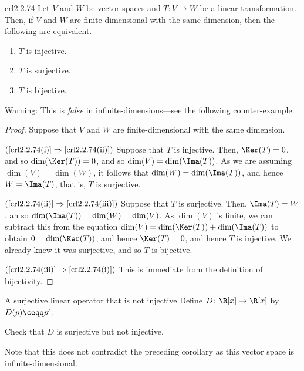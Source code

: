 \begin{crl}{}{crl2.2.74}
	Let $V$ and $W$ be vector spaces and $T\colon V\rightarrow W$ be a linear-transformation.  Then, if $V$ and $W$ are finite-dimensional with the same dimension, then the following are equivalent.
	\begin{enumerate}
		\item \label{crl2.2.74(i)}$T$ is injective.
		\item \label{crl2.2.74(ii)}$T$ is surjective.
		\item \label{crl2.2.74(iii)}$T$ is bijective.
	\end{enumerate}
	\begin{rmk}
		Warning:  This is \emph{false} in infinite-dimensions---see the following counter-example.
	\end{rmk}
	\begin{proof}
		Suppose that $V$ and $W$ are finite-dimensional with the same dimension.
		
		\blni
		$(\cref{crl2.2.74(i)}\Rightarrow \cref{crl2.2.74(ii)})$ Suppose that $T$ is injective.  Then, $\Ker (T)=0$, and so $\dim (\Ker (T))=0$, and so $\dim (V)=\dim (\Ima (T))$.  As we are assuming $\dim (V)=\dim (W)$, it follows that $\dim (W)=\dim (\Ima (T))$, and hence $W=\Ima (T)$, that is, $T$ is surjective.
		
		\blni
		$(\cref{crl2.2.74(ii)}\Rightarrow \cref{crl2.2.74(iii)})$ Suppose that $T$ is surjective.  Then, $\Ima (T)=W$, an so $\dim (\Ima (T))=\dim (W)=\dim (V)$.  As $\dim (V)$ is finite, we can subtract this from the equation $\dim (V)=\dim (\Ker (T))+\dim (\Ima (T))$ to obtain $0=\dim (\Ker (T))$, and hence $\Ker (T)=0$, and hence $T$ is injective.  We already knew it was surjective, and so $T$ is bijective.
		
		\blni
		$(\cref{crl2.2.74(iii)}\Rightarrow \cref{crl2.2.74(i)})$ This is immediate from the definition of bijectivity.
	\end{proof}
\end{crl}
\begin{exm}{A surjective linear operator that is not injective}{}
	Define $D\colon \R [x]\rightarrow \R [x]$ by $D(p)\ceqq p'$.
	\begin{exr}[breakable=false]{}{}
		Check that $D$ is surjective but not injective.
		\begin{rmk}
			Note that this does not contradict the preceding corollary as this vector space is infinite-dimensional.
		\end{rmk}
	\end{exr}
\end{exm}


